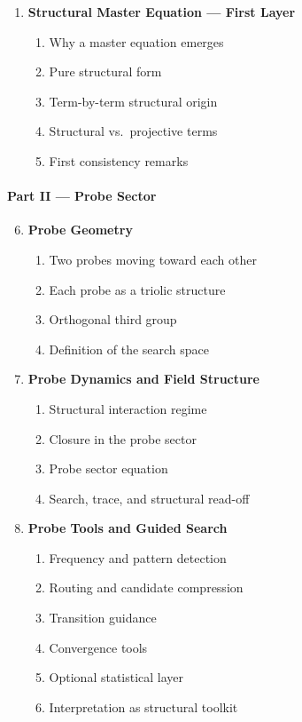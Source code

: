 \begin{enumerate}[leftmargin=2em,label=\arabic*.]
\begin{enumerate}[label*=\arabic*., leftmargin=2.5em]
      \item Septinion / seption confinement
      \item Structural consequences
    \end{enumerate}
  \item \textbf{Structural Master Equation --- First Layer}
    \begin{enumerate}[label*=\arabic*., leftmargin=2.5em]
      \item Why a master equation emerges
      \item Pure structural form
      \item Term-by-term structural origin
      \item Structural vs.\ projective terms
      \item First consistency remarks
    \end{enumerate}
\end{enumerate}

\paragraph{Part II --- Probe Sector}
\begin{enumerate}[leftmargin=2em,label=\arabic*.]
  \setcounter{enumi}{5}
  \item \textbf{Probe Geometry}
    \begin{enumerate}[label*=\arabic*., leftmargin=2.5em]
      \item Two probes moving toward each other
      \item Each probe as a triolic structure
      \item Orthogonal third group
      \item Definition of the search space
    \end{enumerate}
  \item \textbf{Probe Dynamics and Field Structure}
    \begin{enumerate}[label*=\arabic*., leftmargin=2.5em]
      \item Structural interaction regime
      \item Closure in the probe sector
      \item Probe sector equation
      \item Search, trace, and structural read-off
    \end{enumerate}
  \item \textbf{Probe Tools and Guided Search}
    \begin{enumerate}[label*=\arabic*., leftmargin=2.5em]
      \item Frequency and pattern detection
      \item Routing and candidate compression
      \item Transition guidance
      \item Convergence tools
      \item Optional statistical layer
      \item Interpretation as structural toolkit
    \end{enumerate}
\end{enumerate}


